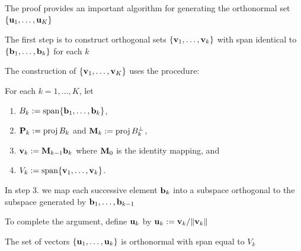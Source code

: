 \begin{frame}
    
    \vspace{2em}
    The proof provides an important algorithm for generating
    the orthonormal set $\{{\mathbf u}_1, \ldots, {\mathbf u}_K\}$
    
    \vspace{1em}
    The first step is to
    construct orthogonal sets $\{{\mathbf v}_1, \ldots, {\mathbf v}_k\}$ with span identical
    to $\{{\mathbf b}_1, \ldots, {\mathbf b}_k\}$ for each $k$
    
    The construction of
    $\{{\mathbf v}_1, \ldots, {\mathbf v}_K\}$ uses the  procedure:
    
    For each $k = 1, \ldots, K$, let 
    \begin{enumerate}
        \item $B_k := \operatorname{span}\{{\mathbf b}_1, \ldots, {\mathbf b}_k\}$,
        \item $\mathbf P_k := \operatorname{proj} B_k$ and $\mathbf M_k := \operatorname{proj} B_k^{\perp}$,
        \item ${\mathbf v}_k := \mathbf M_{k-1} {\mathbf b}_k$ where $\mathbf M_0$ is the identity
            mapping, and
        \item $V_k := \operatorname{span}\{{\mathbf v}_1, \ldots, {\mathbf v}_k\}$.
    \end{enumerate}
    
\end{frame}

\begin{frame}

    \vspace{2em}
    In step 3. we map each successive element ${\mathbf b}_k$ into a subspace 
    orthogonal to the subspace generated by ${\mathbf b}_1, \ldots, {\mathbf b}_{k-1}$
    
    \vspace{.7em}
    To complete the argument, define ${\mathbf u}_k$ by ${\mathbf u}_k :=
    {\mathbf v}_k / \| {\mathbf v}_k \|$ 
    
    The  set of vectors 
    $\{{\mathbf u}_1, \ldots, {\mathbf u}_k\}$ is orthonormal with span equal to $V_k$
    
\end{frame}



